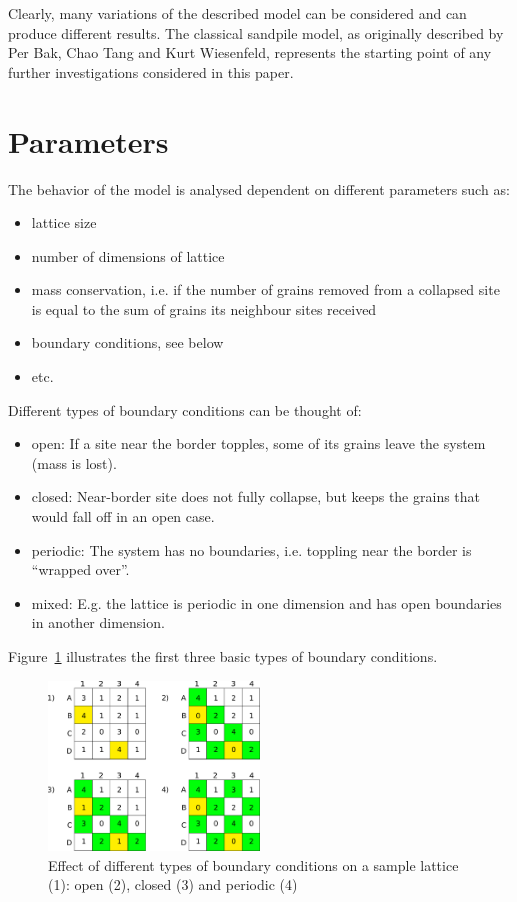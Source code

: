 Clearly, many variations of the described model can be considered and can produce different results. The classical sandpile model, as originally described by Per Bak, Chao Tang and Kurt Wiesenfeld, represents the starting point of any further investigations considered in this paper.

\section{Parameters}
The behavior of the model is analysed dependent on different parameters such as:
\begin{itemize}
 \item lattice size
 \item number of dimensions of lattice
 \item mass conservation, i.e. if the number of grains removed from a collapsed site is equal to the sum of grains its neighbour sites received
 \item boundary conditions, see below
 \item etc.
\end{itemize}
Different types of boundary conditions can be thought of:
\begin{itemize}
 \item open: If a site near the border topples, some of its grains leave the system (mass is lost).
 \item closed: Near-border site does not fully collapse, but keeps the grains that would fall off in an open case.
 \item periodic: The system has no boundaries, i.e. toppling near the border is ``wrapped over''.
 \item mixed: E.g. the lattice is periodic in one dimension and has open boundaries in another dimension.
\end{itemize}
Figure~\ref{pics:boundary} illustrates the first three basic types of boundary conditions.

\begin{figure}[!htpb]
\centering
\includegraphics[width=0.5\textwidth]{pics/pic4_boundary.pdf}
\caption[]{Effect of different types of boundary conditions on a sample lattice (1): open (2), closed (3) and periodic (4)}
\label{pics:boundary}
\end{figure}

